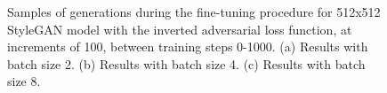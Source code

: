   \begin{figure}[!htbp]
    \centering
    \hfill
    \hfill
    \caption[Samples of generations during the fine-tuning procedure for 512x512 StyleGAN model with the inverted adversarial loss function]{Samples of generations during the fine-tuning procedure for 512x512 StyleGAN model with the inverted adversarial loss function, at increments of 100, between training steps 0-1000. (a) Results with batch size 2. (b) Results with batch size 4. (c) Results with batch size 8.}
    \label{fig:c4:512-OG-samples}
  \end{figure}


